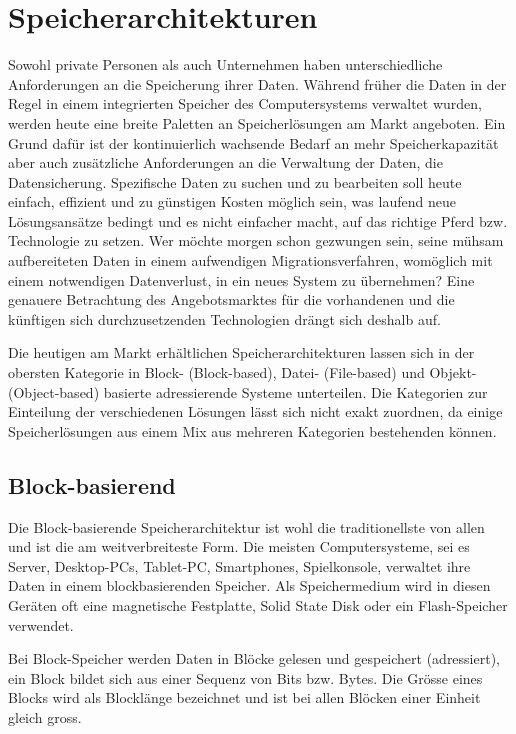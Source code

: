 \cleardoublepage
\chapter{Speicherarchitekturen}

Sowohl private Personen als auch Unternehmen haben unterschiedliche Anforderungen an die Speicherung ihrer Daten. Während früher die Daten in der Regel in einem integrierten Speicher des Computersystems verwaltet wurden, werden heute eine breite Paletten an Speicherlösungen am Markt angeboten. Ein Grund dafür ist der kontinuierlich wachsende Bedarf an mehr Speicherkapazität aber auch zusätzliche Anforderungen an die Verwaltung der Daten, die Datensicherung. Spezifische Daten zu suchen und zu bearbeiten soll heute einfach, effizient und zu günstigen Kosten möglich sein, was laufend neue Lösungsansätze bedingt und es nicht einfacher macht, auf das richtige Pferd bzw. Technologie zu setzen. Wer möchte morgen schon gezwungen sein, seine mühsam aufbereiteten Daten in einem aufwendigen Migrationsverfahren, womöglich mit einem notwendigen Datenverlust, in ein neues System zu übernehmen? Eine genauere Betrachtung des Angebotsmarktes für die vorhandenen und die künftigen sich durchzusetzenden Technologien drängt sich deshalb auf.

Die heutigen am Markt erhältlichen Speicherarchitekturen lassen sich in der obersten Kategorie in Block- (Block-based), Datei- (File-based) und Objekt- (Object-based) basierte adressierende Systeme unterteilen. Die Kategorien zur Einteilung der verschiedenen Lösungen lässt sich nicht exakt zuordnen, da einige Speicherlösungen aus einem Mix aus mehreren Kategorien bestehenden können.

\section{Block-basierend}
Die Block-basierende Speicherarchitektur ist wohl die traditionellste von allen und ist die am weitverbreiteste Form. Die meisten Computersysteme, sei es Server, Desktop-PCs, Tablet-PC, Smartphones, Spielkonsole, verwaltet ihre Daten in einem blockbasierenden Speicher. Als Speichermedium wird in diesen Geräten oft eine magnetische Festplatte, Solid State Disk oder ein Flash-Speicher verwendet.

Bei Block-Speicher werden Daten in Blöcke gelesen und gespeichert (adressiert), ein Block bildet sich aus einer Sequenz von Bits bzw. Bytes. Die Grösse eines Blocks wird als Blocklänge bezeichnet und ist bei allen Blöcken einer Einheit gleich gross. 

